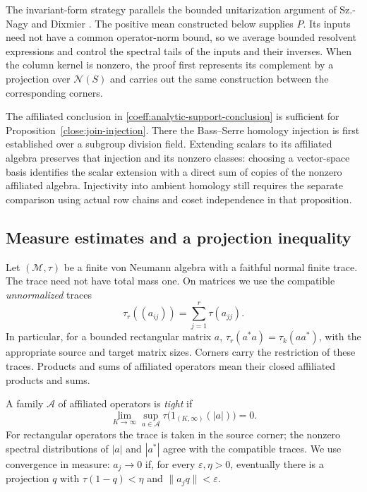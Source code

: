 The invariant-form strategy parallels the bounded unitarization
argument of Sz.-Nagy and Dixmier
\cite[Section~5, Theorem~6]{Dixmier1950Means}.
The positive mean constructed below supplies \(P\). Its inputs
need not have a common operator-norm bound, so we average bounded
resolvent expressions and control the spectral tails of the inputs
and their inverses. When the column kernel is nonzero, the proof
first represents its complement by a projection over \(\mathcal N(S)\)
and carries out the same construction between the corresponding
corners.

The affiliated conclusion in \eqref{coeff:analytic-support-conclusion}
is sufficient for Proposition~\ref{close:join-injection}. There the
Bass--Serre homology injection is first established over a subgroup
division field. Extending scalars to its affiliated algebra preserves
that injection and its nonzero classes: choosing a vector-space
basis identifies the scalar extension with a direct sum of copies
of the nonzero affiliated algebra. Injectivity into ambient homology
still requires the separate comparison using actual row chains and
coset independence in that proposition.

\subsection{Measure estimates and a projection inequality}

Let \((\mathcal M,\tau)\) be a finite von Neumann algebra with a faithful
normal finite trace.  The trace need not have total mass one.  On matrices
we use the compatible \emph{unnormalized} traces
\[
 \tau_r((a_{ij}))=\sum_{j=1}^r\tau(a_{jj}).
\]
In particular, for a bounded rectangular matrix \(a\),
\(\tau_r(a^*a)=\tau_k(aa^*)\), with the appropriate source and target
matrix sizes.  Corners carry the restriction of these traces.  Products
and sums of affiliated operators mean their closed affiliated products
and sums.

A family \(\mathcal A\) of affiliated operators is \emph{tight} if
\[
 \lim_{K\longrightarrow\infty}
 \sup_{a\in\mathcal A}\tau\bigl(1_{(K,\infty)}(|a|)\bigr)=0.
\]
For rectangular operators the trace is taken in the source corner;
the nonzero spectral distributions of \(|a|\) and \(|a^*|\) agree
with the compatible traces.  We use convergence in measure: \(a_j\to0\)
if, for every \(\varepsilon,\eta>0\), eventually there is a projection
\(q\) with \(\tau(1-q)<\eta\) and \(\|a_jq\|<\varepsilon\).

